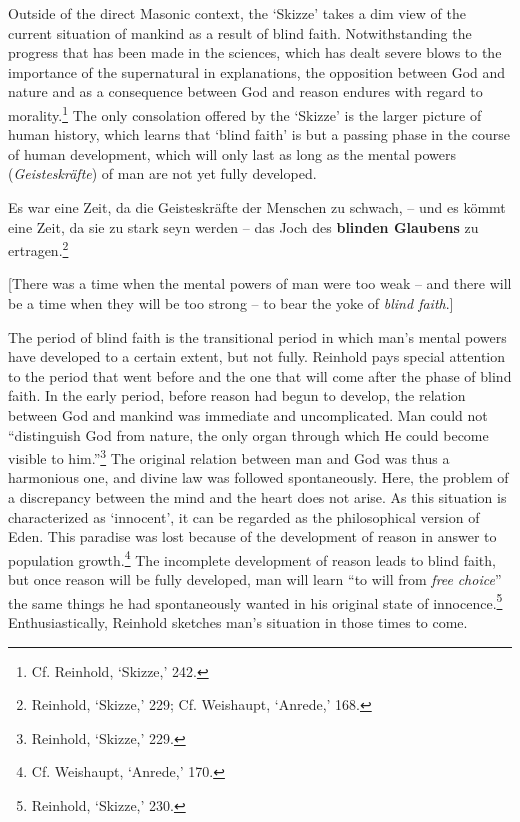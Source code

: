  Outside of the direct Masonic context, the `Skizze' takes a dim view of the current situation of mankind as a result of blind faith. Notwithstanding the progress that has been made in the sciences, which has dealt severe blows to the importance of the supernatural in explanations, the opposition between God and nature and as a consequence between God and reason endures with regard to morality.\footnote{ Cf. Reinhold, `Skizze,' 242. } The only consolation offered by the `Skizze' is the larger picture of human history, which learns that `blind faith' is but a passing phase in the course of human development, which will only last as long as the mental powers (\textit{Geisteskr\"{a}fte}) of man are not yet fully developed. 

Es war eine Zeit, da die Geisteskr\"{a}fte der Menschen zu schwach, {--} und es k\"{o}mmt eine Zeit, da sie zu stark seyn werden {--} das Joch des \textbf{blinden Glaubens} zu ertragen.\footnote{ Reinhold, `Skizze,' 229; Cf. Weishaupt, `Anrede,' 168.}

[There was a time when the mental powers of man were too weak {--} and there will be a time when they will be too strong {--} to bear the yoke of \textit{blind faith}.] 

The period of blind faith is the transitional period in which man's mental powers have developed to a certain extent, but not fully. Reinhold pays special attention to the period that went before and the one that will come after the phase of blind faith. In the early period, before reason had begun to develop, the relation between God and mankind was immediate and uncomplicated. Man could not ``distinguish God from nature, the only organ through which He could become visible to him.''\footnote{ Reinhold, `Skizze,' 229. } The original relation between man and God was thus a harmonious one, and divine law was followed spontaneously. Here, the problem of a discrepancy between the mind and the heart does not arise. As this situation is characterized as `innocent', it can be regarded as the philosophical version of Eden. This paradise was lost because of the development of reason in answer to population growth.\footnote{ Cf. Weishaupt, `Anrede,' 170. } The incomplete development of reason leads to blind faith, but once reason will be fully developed, man will learn ``to will from \textit{free} \textit{choice}'' the same things he had spontaneously wanted in his original state of innocence.\footnote{ Reinhold, `Skizze,' 230.} Enthusiastically, Reinhold sketches man's situation in those times to come. 

